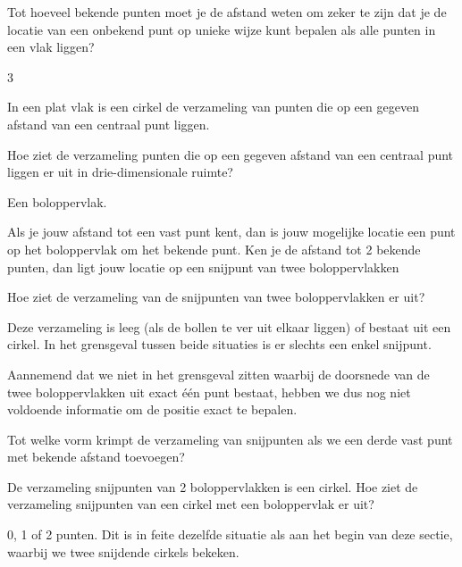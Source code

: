 \begin{opgave}
	Tot hoeveel bekende punten moet je de afstand weten om zeker te zijn dat je de locatie van een onbekend punt op unieke wijze kunt bepalen als alle punten in een vlak liggen?
	\begin{antwoord}
		3
	\end{antwoord}
\end{opgave}

In een plat vlak is een cirkel de verzameling van punten die op een gegeven afstand van een centraal punt liggen.

\begin{opgave}
	Hoe ziet de verzameling punten die op een gegeven afstand van een centraal punt liggen er uit in drie-dimensionale ruimte?
	\begin{antwoord}
		Een boloppervlak.
	\end{antwoord}
\end{opgave}

Als je jouw afstand tot een vast punt kent, dan is jouw mogelijke locatie een punt op het boloppervlak om het bekende punt. Ken je de afstand tot 2 bekende punten, dan ligt jouw locatie op een snijpunt van twee boloppervlakken

\begin{opgave}
	Hoe ziet de verzameling van de snijpunten van twee boloppervlakken er uit?
		\begin{antwoord}
			Deze verzameling is leeg (als de bollen te ver uit elkaar liggen) of bestaat uit een cirkel. In het grensgeval tussen beide situaties is er slechts een enkel snijpunt.
		\end{antwoord}
\end{opgave}

Aannemend dat we niet in het grensgeval zitten waarbij de doorsnede van de twee boloppervlakken uit exact \'e\'en punt bestaat, hebben we dus nog niet voldoende informatie om de positie exact te bepalen.

\begin{opgave}[\vinger]
	Tot welke vorm krimpt de verzameling van snijpunten als we een derde vast punt met bekende afstand toevoegen?
	\begin{hint}
		De verzameling snijpunten van 2 boloppervlakken is een cirkel. Hoe ziet de verzameling snijpunten van een cirkel met een boloppervlak er uit?
	\end{hint}
	\begin{antwoord}
		0, 1 of 2 punten. Dit is in feite dezelfde situatie als aan het begin van deze sectie, waarbij we twee snijdende cirkels bekeken.
	\end{antwoord}
\end{opgave}

